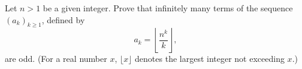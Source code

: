 Let 
$n > 1$
 be a given integer. Prove that infinitely many terms of the sequence 
$(a_k)_{k \ge 1}$, 
 defined by 
\[a_k=\left\lfloor\frac{n^k}{k}\right\rfloor,\]
 are odd. (For a real number 
$x$, 
$\lfloor x \rfloor$
 denotes the largest integer not exceeding 
$x$.)
